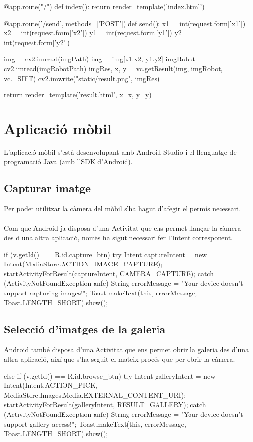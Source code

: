 		\begin{python}
@app.route("/")
def index():
	return render_template('index.html')

@app.route('/send', methods=['POST'])
def send():
	x1 = int(request.form['x1'])
	x2 = int(request.form['x2'])
	y1 = int(request.form['y1'])
	y2 = int(request.form['y2'])

	img = cv2.imread(imgPath)
	img = img[x1:x2, y1:y2]
	imgRobot = cv2.imread(imgRobotPath)
	imgRes, x, y = vc.getResult(img, imgRobot, vc._SIFT)
	cv2.imwrite("static/result.png", imgRes)

	return render_template('result.html', x=x, y=y)
		\end{python}


\section{Aplicació mòbil}
	L'aplicació mòbil s'està desenvolupant amb Android Studio i el llenguatge de programació Java (amb l'SDK d'Android).
	\subsection{Capturar imatge}
		Per poder utilitzar la càmera del mòbil s'ha hagut d'afegir el permís necessari.\\\\
		Com que Android ja disposa d'una Activitat que ens permet llançar la càmera des d'una altra aplicació, només ha sigut necessari fer l'Intent corresponent.\\
		\begin{java}
if (v.getId() == R.id.capture_btn) try {
	Intent captureIntent = new Intent(MediaStore.ACTION_IMAGE_CAPTURE);
	startActivityForResult(captureIntent, CAMERA_CAPTURE);
} catch (ActivityNotFoundException anfe) {
	String errorMessage = "Your device doesn't support capturing images!";
	Toast.makeText(this, errorMessage, Toast.LENGTH_SHORT).show();
}
		\end{java}
	\subsection{Selecció d'imatges de la galeria}
		Android també disposa d'una Activitat que ens permet obrir la galeria des d'una altra aplicació, així que s'ha seguit el mateix procés que per obrir la càmera.\\
		\begin{java}
else if (v.getId() == R.id.browse_btn) try {
	Intent galleryIntent = new Intent(Intent.ACTION_PICK, MediaStore.Images.Media.EXTERNAL_CONTENT_URI);
	startActivityForResult(galleryIntent, RESULT_GALLERY);
} catch (ActivityNotFoundException anfe) {
	String errorMessage = "Your device doesn't support gallery access!";
	Toast.makeText(this, errorMessage, Toast.LENGTH_SHORT).show();
}
		\end{java}
